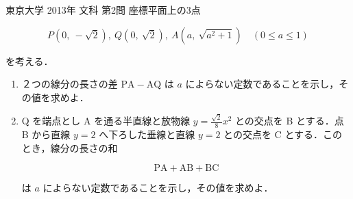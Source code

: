 \documentclass[a4paper]{ltjsarticle}
\begin{document}
\begin{itembox}[l]{東京大学 2013年 文科 第2問}
    座標平面上の3点

    \begin{equation*}
        P(0,\ -\sqrt{2}),\ Q(0,\ \sqrt{2}),\ A(a,\ \sqrt{a^2+1})\quad (0\leq a\leq 1)
    \end{equation*}

    を考える．

    \begin{enumerate}[label=(\arabic*)]
        \item ２つの線分の長さの差 $\mathrm{PA}-\mathrm{AQ}$ は $a$ によらない定数であることを示し，その値を求めよ．
        \item Q を端点とし A を通る半直線と放物線 $y=\frac{\sqrt{2}}{8}x^2$ との交点を B とする．点 B から直線 $y=2$ へ下ろした垂線と直線 $y=2$ との交点を C とする．このとき，線分の長さの和

              \begin{equation*}
                  \mathrm{PA}+\mathrm{AB}+\mathrm{BC}
              \end{equation*}

              は $a$ によらない定数であることを示し，その値を求めよ．
    \end{enumerate}
\end{itembox}
\end{document}
